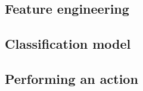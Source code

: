 \lipsum[1-3]


\subsection{Feature engineering}
\label{subsec:processing_signals_general_pipeline_features}




\lipsum[1-5]


\subsection{Classification model}
\label{subsec:processing_signals_general_pipeline_classification}

\lipsum[1-5]


\subsection{Performing an action}
\label{subsec:processing_signals_general_pipeline_perform_action}


